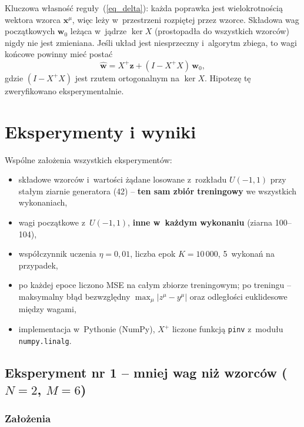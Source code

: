 \documentclass[12pt]{article}
\begin{document}
Kluczowa własność reguły~(\ref{eq_delta}): każda poprawka jest wielokrotnością
wektora wzorca $\mathbf{x}^{\mu}$, więc leży w~przestrzeni rozpiętej przez wzorce.
Składowa wag początkowych $\mathbf{w}_0$ leżąca w~jądrze $\ker X$ (prostopadła
do wszystkich wzorców) nigdy nie jest zmieniana. Jeśli układ jest niesprzeczny
i~algorytm zbiega, to wagi końcowe powinny mieć postać
\begin{equation}
 \hat{\mathbf{w}} = X^{+}\mathbf{z} + (I - X^{+}X)\,\mathbf{w}_0 ,
 \label{eq_pred}
\end{equation}
gdzie $(I - X^{+}X)$ jest rzutem ortogonalnym na $\ker X$. Hipotezę tę zweryfikowano
eksperymentalnie.

\section{Eksperymenty i wyniki}

Wspólne założenia wszystkich eksperymentów:
\begin{itemize}
 \item składowe wzorców i~wartości żądane losowane z~rozkładu $U(-1,1)$ przy stałym
       ziarnie generatora (42) -- \textbf{ten sam zbiór treningowy} we wszystkich wykonaniach,
 \item wagi początkowe z~$U(-1,1)$, \textbf{inne w~każdym wykonaniu} (ziarna 100--104),
 \item współczynnik uczenia $\eta = 0{,}01$, liczba epok $K = 10\,000$, 5~wykonań na przypadek,
 \item po każdej epoce liczono MSE na całym zbiorze treningowym; po treningu
       -- maksymalny błąd bezwzględny $\max_{\mu}|z^{\mu}-y^{\mu}|$ oraz odległości
       euklidesowe między wagami,
 \item implementacja w~Pythonie (NumPy), $X^{+}$ liczone funkcją \texttt{pinv} z~modułu \texttt{numpy.linalg}.
\end{itemize}


\subsection{Eksperyment nr 1 -- mniej wag niż wzorców ($N=2$, $M=6$)}

\subsubsection{Założenia}
\end{document}

